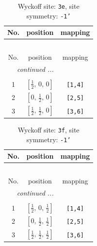 \documentclass[fleqn,8pt]{jsarticle}
\begin{document}
\begin{longtable}{ccc}
\caption{Wyckoff site: {\tt 3e}, site symmetry: {\tt -1'}}
 \\
 \hline \hline
No. & position & mapping \\ \hline \endfirsthead

\multicolumn{2}{l}{\tablename\ \thetable{}} \\
 \hline \hline
No. & position & mapping \\ \hline \endhead

 \hline \hline
\multicolumn{2}{r}{\footnotesize\it continued ...} \\ \endfoot

 \hline \hline
\multicolumn{2}{r}{} \\ \endlastfoot

1 & $\left[ \frac{1}{2},\, 0,\, 0 \right]$ & {\tt [1,4]} \\ \hline
2 & $\left[ 0,\, \frac{1}{2},\, 0 \right]$ & {\tt [2,5]} \\ \hline
3 & $\left[ \frac{1}{2},\, \frac{1}{2},\, 0 \right]$ & {\tt [3,6]} \\
\end{longtable}
\renewcommand{\arraystretch}{1.2}
\begin{longtable}{ccc}
\caption{Wyckoff site: {\tt 3f}, site symmetry: {\tt -1'}}
 \\
 \hline \hline
No. & position & mapping \\ \hline \endfirsthead

\multicolumn{2}{l}{\tablename\ \thetable{}} \\
 \hline \hline
No. & position & mapping \\ \hline \endhead

 \hline \hline
\multicolumn{2}{r}{\footnotesize\it continued ...} \\ \endfoot

 \hline \hline
\multicolumn{2}{r}{} \\ \endlastfoot

1 & $\left[ \frac{1}{2},\, 0,\, \frac{1}{2} \right]$ & {\tt [1,4]} \\ \hline
2 & $\left[ 0,\, \frac{1}{2},\, \frac{1}{2} \right]$ & {\tt [2,5]} \\ \hline
3 & $\left[ \frac{1}{2},\, \frac{1}{2},\, \frac{1}{2} \right]$ & {\tt [3,6]} \\
\end{longtable}
\renewcommand{\arraystretch}{1.2}
\end{document}
